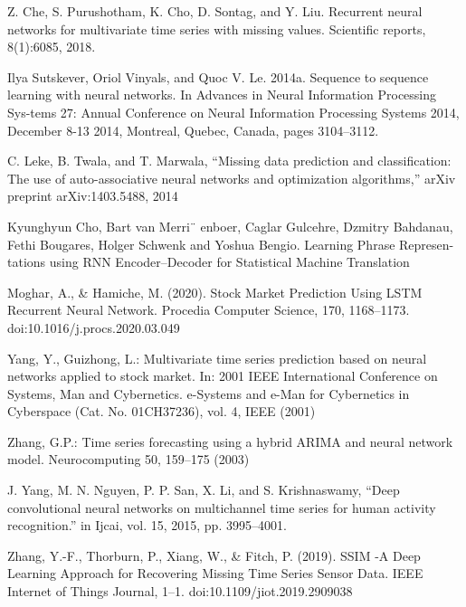 \documentclass[12pt]{report}
\begin{document}
\begin{thebibliography}{}
 Z. Che, S. Purushotham, K. Cho, D. Sontag, and Y. Liu. Recurrent neural networks for multivariate time series with missing values. Scientific reports, 8(1):6085, 2018.


  Ilya Sutskever, Oriol Vinyals, and Quoc V. Le. 2014a. Sequence to sequence learning with neural networks. In Advances in Neural Information Processing Sys-tems 27: Annual Conference on Neural Information Processing Systems 2014, December 8-13 2014, Montreal, Quebec, Canada, pages 3104–3112.

C. Leke, B. Twala, and T. Marwala, “Missing data prediction and classiﬁcation: The use of auto-associative neural networks and optimization algorithms,” arXiv preprint arXiv:1403.5488, 2014

 Kyunghyun Cho, Bart van Merri¨ enboer, Caglar Gulcehre, Dzmitry Bahdanau, Fethi Bougares, Holger Schwenk and Yoshua Bengio. Learning Phrase Represen-tations using RNN Encoder–Decoder for Statistical Machine Translation

 Moghar, A., \& Hamiche, M. (2020). Stock Market Prediction Using LSTM Recurrent Neural Network. Procedia Computer Science, 170, 1168–1173. doi:10.1016/j.procs.2020.03.049 


  Yang, Y., Guizhong, L.: Multivariate time series prediction based on neural networks applied to stock market. In: 2001 IEEE International Conference on Systems, Man and Cybernetics. e-Systems and e-Man for Cybernetics in Cyberspace (Cat. No. 01CH37236), vol. 4, IEEE (2001)

 Zhang, G.P.: Time series forecasting using a hybrid ARIMA and neural network model. Neurocomputing 50, 159–175 (2003)

  J. Yang, M. N. Nguyen, P. P. San, X. Li, and S. Krishnaswamy, “Deep convolutional neural networks on multichannel time series for human activity recognition.” in Ijcai, vol. 15, 2015, pp. 3995–4001. 

 Zhang, Y.-F., Thorburn, P., Xiang, W., \& Fitch, P. (2019). SSIM -A Deep Learning Approach for Recovering Missing Time Series Sensor Data. IEEE Internet of Things Journal, 1–1. doi:10.1109/jiot.2019.2909038 

\end{thebibliography}
\end{document}
